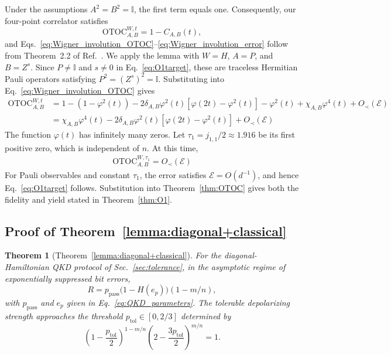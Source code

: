 \documentclass[onecolumn,prx,longbibliography,nofootinbib, superscriptaddress]{revtex4-2}
\theoremstyle{recap}
\newtheorem*{thmrecap}{Theorem}
\begin{document}
Under the assumptions $A^2=B^2=\mathbb{I}$, the first term equals one. Consequently, our four-point correlator satisfies
\[
    \mathrm{OTOC}_{A,B}^{W,t}=1-C_{A,B}(t),
\]
and Eqs.~\eqref{eq:Wigner_involution_OTOC}--\eqref{eq:Wigner_involution_error} follow from Theorem~2.2 of Ref.~\cite{cipolloni2024outoftimeorderedcorrelatorswignermatrices}.
We apply the lemma with $W=H$, $A=P$, and $B=Z^{s}$. Since $P\neq\mathbb{I}$ and $s\neq0$ in Eq.~\eqref{eq:O1target}, these are traceless Hermitian Pauli operators satisfying $P^2=(Z^{s})^2=\mathbb{I}$. Substituting into Eq.~\eqref{eq:Wigner_involution_OTOC} gives
\begin{equation}
\begin{split}
    \mathrm{OTOC}_{A,B}^{W,t}&=1-(1-\varphi^2(t))-2\delta_{A,B}\varphi^2(t)[\varphi(2t)-\varphi^2(t)]-\varphi^2(t)+\chi_{A,B}\varphi^4(t)+O_{\prec}(\mathcal{E})\\
    &=\chi_{A,B}\varphi^4(t)-2\delta_{A,B}\varphi^2(t)[\varphi(2t)-\varphi^2(t)]+O_{\prec}(\mathcal{E})
\end{split}
\end{equation}
The function $\varphi(t)$ has infinitely many zeros. Let $\tau_1=j_{1,1}/2\approx 1.916$ be its first positive zero, which is independent of $n$. At this time,
\begin{equation}
\begin{split}
    \mathrm{OTOC}_{A,B}^{W,\tau_1}=O_{\prec}(\mathcal{E})
\end{split}
\end{equation}
For Pauli observables and constant $\tau_1$, the error satisfies $\mathcal{E}=O(d^{-1})$, and hence Eq.~\eqref{eq:O1target} follows. Substitution into Theorem~\ref{thm:OTOC} gives both the fidelity and yield stated in Theorem~\ref{thm:O1}.



\subsection{Proof of Theorem~\ref{lemma:diagonal+classical}}\label{appendix:QKD_tolerance}
\begin{thmrecap}[Theorem~\ref{lemma:diagonal+classical}]
    For the diagonal-Hamiltonian QKD protocol of Sec.~\ref{sec:tolerance}, in the asymptotic regime of exponentially suppressed bit errors,
    \begin{equation}
        R=p_{\mathrm{pass}}\bigl(1-H(e_p)\bigr)(1-m/n),
    \end{equation}
    with $p_{\mathrm{pass}}$ and $e_p$ given in Eq.~\eqref{eq:QKD_parameters}. The tolerable depolarizing strength approaches the threshold $p_{\mathrm{tol}}\in[0,2/3]$ determined by
    \begin{equation}\label{eq:tolerance_appendix}
        \left(1-\frac{p_{\mathrm{tol}}}{2}\right)^{1-m/n}
        \left(2-\frac{3p_{\mathrm{tol}}}{2}\right)^{m/n}=1.
    \end{equation}
\end{thmrecap}
\end{document}
